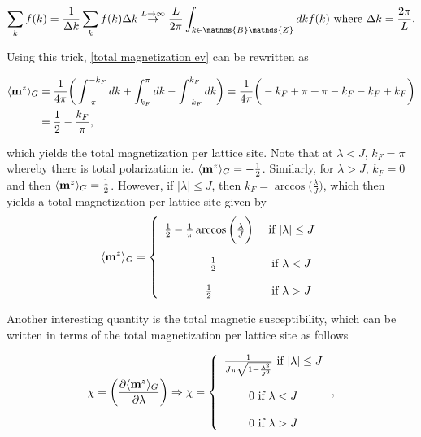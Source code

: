 \documentclass{homework}
\begin{document}
\begin{equation*}
    \sum_{k} f(k) = \frac{1}{\Delta k} \sum_{k} f(k) \Delta k \overset{L \rightarrow \infty}{\rightarrow} \frac{L}{2\pi}\int_{k \in \mathds{B}\mathds{Z}} dk f(k) \textnormal{ where } \Delta k = \frac{2\pi}{L}.
\end{equation*}

Using this trick, \eqref{total magnetization ev} can be rewritten as 

\begin{align}
    \langle {{\bf m}}^{z} \rangle_{G} &= \frac{1}{4\pi} \bigg(\int_{-\pi}^{-k_F} dk + \int_{k_F}^{\pi} dk - \int_{-k_F}^{k_F} dk \bigg) = \frac{1}{4\pi} \bigg(-k_F + \pi + \pi - k_F - k_F + k_F\bigg) \\
    &= \frac{1}{2} - \frac{k_F}{\pi},
\end{align}

which yields the total magnetization per lattice site. Note that at $\lambda < J$, $k_F = \pi$ whereby there is total polarization ie. $\langle {{\bf m}}^{z} \rangle_{G} = -\frac{1}{2}$. Similarly, for $\lambda > J$, $k_F = 0$ and then $\langle {{\bf m}}^{z} \rangle_{G} = \frac{1}{2}$. However, if $|\lambda| \leq J$, then $k_F = \arccos\bigg(\frac{\lambda}{J}\bigg)$, which then yields a total magnetization per lattice site given by 
\begin{equation} \langle {{\bf m}}^{z} \rangle_{G}  = \left\{
    \begin{array}{cc}
          \frac{1}{2} - \frac{1}{\pi}\arccos\bigg(\frac{\lambda}{J}\bigg)&  \textnormal{ if } |\lambda| \leq J  \\
          \\
          -\frac{1}{2} & \textnormal{ if } \lambda < J  \\
          \\
          \frac{1}{2} & \textnormal{ if } \lambda > J  \\
    \end{array} \right.
\end{equation}

Another interesting quantity is the total magnetic susceptibility, which can be written in terms of the total magnetization per lattice site as follows 

\begin{align}
    \chi = \bigg(\frac{\partial \langle {{\bf m}}^{z} \rangle_{G}}{\partial \lambda}\bigg) \Rightarrow \chi = \left\{ \begin{array}{cc} 
         \frac{1}{J \pi \sqrt{1- \frac{\lambda^2}{J^2}}} \textnormal{ if } |\lambda| \leq J  \\
         \\
          0 \textnormal{ if } \lambda < J \\ 
         \\
          0 \textnormal{ if } \lambda > J  \\
              \end{array} \right., \label{}
\end{align}
\end{document}
